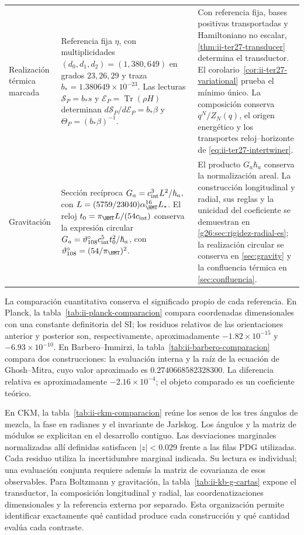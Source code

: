 \begin{longtable}{@{}p{.13\linewidth}p{.415\linewidth}p{.395\linewidth}@{}}
Realización térmica marcada & Referencia fija $\eta$, con multiplicidades
$(d_0,d_1,d_2)=(1,380,649)$ en grados $23,26,29$ y traza
$b_*=1.380649\times10^{-23}$.
Las lecturas $\mathcal S_P=b_*s$ y $\mathcal E_P=\operatorname{Tr}(\rho H)$
determinan $d\mathcal S_P/d\mathcal E_P=b_*\beta$ y
$\Theta_P=(b_*\beta)^{-1}$.
& Con referencia fija, bases positivas transportadas y Hamiltoniano no
escalar, \ref{thm:ii-ter27-transducer} determina el transductor.
El corolario~\ref{cor:ii-ter27-variational} prueba el mínimo único.
La composición conserva $q^N/Z_N(q)$, el origen energético y los
transportes reloj--horizonte de \eqref{eq:ii-ter27-intertwiner}.\\[5pt]
Gravitación & Sección recíproca
$G_a=c_{\rm int}^{3}L^2/\hbar_a$,
con $L=(5759/23040)\alpha_{\HMT}^{16}L_*$.
El reloj $t_0=\pi_{\HMT}L/(54c_{\rm int})$ conserva la expresión
circular $G_a=\vartheta_{108}^{\circ}c_{\rm int}^{5}t_0^2/\hbar_a$,
con $\vartheta_{108}^{\circ}=(54/\pi_{\HMT})^2$.
& El producto $G_a\hbar_a$ conserva la normalización areal.
La construcción longitudinal y radial, sus reglas y la unicidad del
coeficiente se demuestran en \ref{g26:sec:rigidez-radial-es};
la realización circular se conserva en \ref{sec:gravity} y la confluencia térmica en
\ref{sec:confluencia}.\\
\end{longtable}
\endgroup

La comparación cuantitativa conserva el significado propio de cada
referencia. En Planck, la tabla~\ref{tab:ii-planck-comparacion} compara
coordenadas dimensionales con una constante definitoria del SI; los
residuos relativos de las orientaciones anterior y posterior son,
respectivamente, aproximadamente $-1.82\times10^{-15}$ y
$-6.93\times10^{-10}$. En Barbero--Immirzi, la
tabla~\ref{tab:ii-barbero-comparacion} compara dos construcciones:
la evaluación interna y la raíz de la ecuación de Ghosh--Mitra, cuyo
valor aproximado es $0.2740668582328300$. La diferencia relativa es
aproximadamente $-2.16\times10^{-4}$; el objeto comparado es un
coeficiente teórico.

En CKM, la tabla~\ref{tab:ii-ckm-comparacion} reúne los senos de los
tres ángulos de mezcla, la fase en radianes y el invariante de Jarlskog.
Los ángulos y la matriz de módulos se explicitan en el desarrollo
contiguo.
Las desviaciones marginales normalizadas allí definidas satisfacen
$|z|<0.029$ frente a las filas PDG utilizadas. Cada residuo utiliza
la incertidumbre marginal indicada. Su lectura es individual;
una evaluación conjunta requiere además la matriz de covarianza
de esos observables.
Para Boltzmann y gravitación, la tabla~\ref{tab:ii-kb-g-cartas}
expone el transductor, la composición longitudinal y radial, las coordenatizaciones dimensionales
y la referencia externa por separado. Esta organización permite
identificar exactamente qué cantidad produce cada construcción y
qué cantidad evalúa cada contraste.

